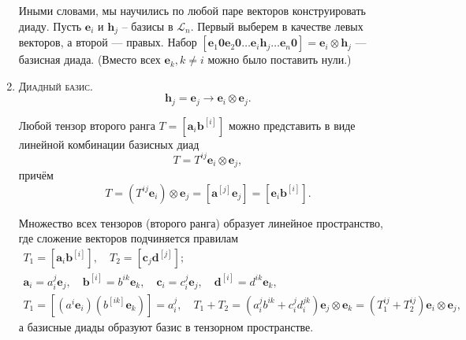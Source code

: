 \begin{definition}[геометрическое]
\begin{enumerate}
		Иными словами, мы научились по любой паре векторов конструировать диаду. Пусть $\mathbf{e}_i$ и
		$\mathbf{h}_j$ -- базисы в $\mathcal{L}_n$. Первый выберем в качестве левых векторов, а
		второй --- правых. Набор $[\mathbf{e}_1 \mathbf{0} \mathbf{e}_2 \mathbf{0}
		\dots \mathbf{e}_i \mathbf{h}_j \dots \mathbf{e}_n \mathbf{0}] =
		\mathbf{e}_i \otimes \mathbf{h}_j$ --- базисная диада. (Вместо всех
		$\mathbf{e}_k, k\neq i$ можно было поставить нули.) 
		
		\item \textsc{Диадный базис.}
		\begin{equation*}
			\mathbf{h}_j = \mathbf{e}_j \longrightarrow \mathbf{e}_i \otimes
			\mathbf{e}_j.
		\end{equation*}
		
		\begin{theorem}
			Любой тензор второго ранга $ T = [\mathbf{a}_i \mathbf{b}^{[i]}]$ можно представить в виде линейной комбинации базисных диад
			\begin{equation}\label{lec_2:eq:tensor_basis}
				T = T^{ij} \mathbf{e}_i \otimes \mathbf{e}_j,
			\end{equation}
			причём
			\[
			T = (T^{ij} \mathbf{e}_i) \otimes \mathbf{e}_j
			= [\mathbf{a}^{[j]} \mathbf{e}_j]
			= [\mathbf{e}_i \mathbf{b}^{[i]}].
			\]
		\end{theorem}
		\begin{corollary*}
			Множество всех тензоров (второго ранга) образует линейное пространство,
			где сложение векторов подчиняется правилам
			\begin{gather*}
				T_1 = [\mathbf{a}_i \mathbf{b}^{[i]}], \quad
				T_2 = [\mathbf{c}_j \mathbf{d}^{[j]}]; \\
				\mathbf{a}_i = a^j_i \mathbf{e}_j, \quad
				\mathbf{b}^{[i]} = b^{ik} \mathbf{e}_k,\quad
				\mathbf{c}_i = c^{j}_{i} \mathbf{e}_j, \quad
				\mathbf{d}^{[i]} = d^{ik} \mathbf{e}_k,  \\
				T_1 = [(a^i \mathbf{e}_i) (b^{[ik]} \mathbf{e}_k)] = a^j_i, \quad
				T_1 + T_2 = (a^j_i b^{ik} + c^{j}_i d^{jk}_i) \mathbf{e}_j \otimes \mathbf{e}_k
				= (T_1^{ij} + T_2^{ij}) \mathbf{e}_i \otimes \mathbf{e}_j,
			\end{gather*}
			а базисные диады образуют базис в тензорном пространстве.
		\end{corollary*}
	\end{enumerate}
\end{definition}

